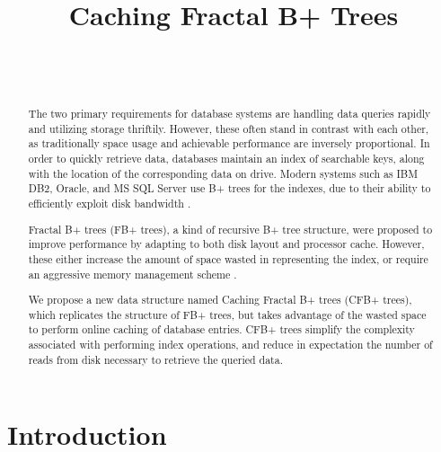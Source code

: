 \documentclass{article}
\begin{document}
\title{Caching Fractal B+ Trees}

\author{ \hfill {}\\ 
\AND
        \hfill {}\\
}

\maketitle

\begin{abstract}
The two primary requirements for database systems are handling data queries rapidly and utilizing storage thriftily.
However, these often stand in contrast with each other,
as traditionally space usage and achievable performance are inversely proportional.
In order to quickly retrieve data,
databases maintain an index of searchable keys, along with the location of the corresponding data on drive.
Modern systems such as IBM DB2, Oracle, and MS SQL Server use B+ trees for the indexes,
due to their ability to efficiently exploit disk bandwidth \citep{Gehrke:2002}.

Fractal B+ trees (FB+ trees), a kind of recursive B+ tree structure, were proposed to improve performance
by adapting to both disk layout and processor cache.
However, these either increase the amount of space wasted in representing the index,
or require an aggressive memory management scheme \citep{Chen:2002}.

We propose a new data structure named Caching Fractal B+ trees (CFB+ trees), which replicates the structure
of FB+ trees, but takes advantage of the wasted space to perform online caching of database entries.
CFB+ trees simplify the complexity associated with performing index operations,
and reduce in expectation the number of reads from disk necessary to retrieve the queried data. 
\end{abstract}

\section{Introduction}
\end{document}
